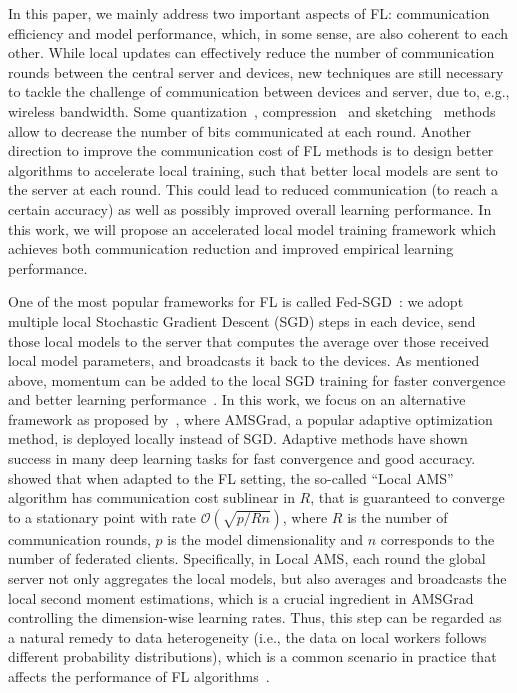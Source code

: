 \documentclass[nohyperref]{article}
\begin{document}
In this paper, we mainly address two important aspects of FL: communication efficiency and model performance, which, in some sense, are also coherent to each other. While local updates can effectively reduce the number of communication rounds between the central server and devices, new techniques are still necessary to tackle the challenge of communication between devices and server, due to, e.g., wireless bandwidth.
Some quantization~\citep{alistarh2017qsgd, wangni2018gradient}, compression~\citep{lin2017deep} and sketching~\citep{Proc:Rothchild_ICML20} methods allow to decrease the number of bits communicated at each round. Another direction to improve the communication cost of FL methods is to design better algorithms to accelerate local training, such that better local models are sent to the server at each round. This could lead to reduced communication (to reach a certain accuracy) as well as possibly improved overall learning performance. In this work, we will propose an accelerated local model training framework which achieves both communication reduction and improved empirical learning performance.


One of the most popular frameworks for FL is called Fed-SGD~\citep{mcmahan2017communication}: we adopt multiple local Stochastic Gradient Descent (SGD) steps in each device, send those local models to the server that computes the average over those received local model parameters, and broadcasts it back to the devices. As mentioned above, momentum can be added to the local SGD training for faster convergence and better learning performance~\citep{yu2019linear}. In this work, we focus on an alternative framework as proposed by~\citet{chen2020toward}, where AMSGrad, a popular adaptive optimization method, is deployed locally instead of SGD. Adaptive methods have shown success in many deep learning tasks for fast convergence and good accuracy. \citet{chen2020toward} showed that when adapted to the FL setting, the so-called ``Local AMS'' algorithm has communication cost sublinear in $R$, that is guaranteed to converge to a stationary point with rate $\mathcal{O}(\sqrt{p/Rn})$, where $R$ is the number of communication rounds, $p$ is the model dimensionality and $n$ corresponds to the number of federated clients. Specifically, in Local AMS, each round the global server not only aggregates the local models, but also averages and broadcasts the local second moment estimations, which is a crucial ingredient in AMSGrad controlling the dimension-wise learning rates. Thus, this step can be regarded as a natural remedy to data heterogeneity (i.e., the data on local workers follows different probability distributions), which is a common scenario in practice that affects the performance of FL algorithms~\citep{li2019federated,liang2019variance,karimireddy2019scaffold}.
\end{document}
